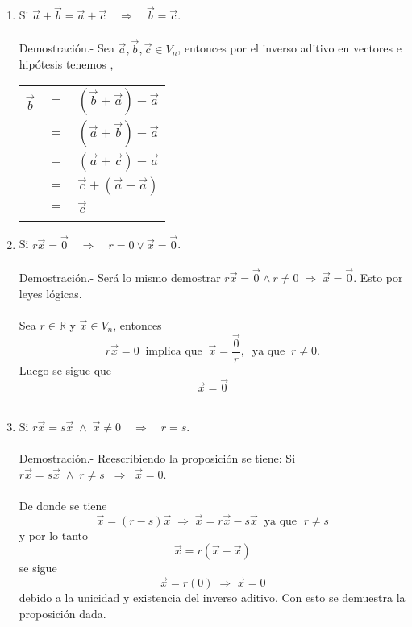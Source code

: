 \begin{enumerate}
\begin{enumerate}[\bfseries a)]
    \item Si $\vec{a}+\vec{b}=\vec{a}+\vec{c} \quad \Longrightarrow \quad \vec{b}=\vec{c}$.\\\\
	Demostración.-\; Sea $\vec{a},\vec{b},\vec{c} \in V_n$, entonces por el inverso aditivo en vectores e hipótesis tenemos ,
	\begin{center}
	    \begin{tabular}{rcl}
		$\vec{b}$&$=$&$(\vec{b}+\vec{a})-\vec{a}$\\
		&$=$&$(\vec{a}+\vec{b})-\vec{a}$\\
		&$=$&$(\vec{a}+\vec{c})-\vec{a}$\\
		&$=$&$\vec{c}+(\vec{a}-\vec{a})$\\
		&$=$&$\vec{c}$\\\\
	    \end{tabular}
	\end{center}

    \item Si $r\vec{x}=\vec{0}\quad \Longrightarrow \quad r=0 \lor \vec{x}=\vec{0}$.\\\\
	Demostración.-\; Será lo mismo demostrar $r\vec{x}=\vec{0}  \land r\neq 0\;\Longrightarrow\;\vec{x}=\vec{0}$. Esto por leyes lógicas.\\\\
	Sea $r\in \mathbb{R}$ y $\vec{x} \in V_n$, entonces $$r\vec{x}=0 \;\; \mbox{implica que}\;\;  \vec{x}=\dfrac{\vec{0}}{r}, \;\; \mbox{ya que}\;\; r\neq 0.$$ Luego se sigue que $$\vec{x}=\vec{0}$$\\

    \item Si $r\vec{x}=s\vec{x}\;\land\; \vec{x}\neq 0 \quad \Longrightarrow \quad r=s$.\\\\
	Demostración.-\; Reescribiendo la proposición se tiene: Si $r\vec{x}=s\vec{x}\; \land \; r\neq s \;\; \Longrightarrow \; \; \vec{x}=0$.\\\\ 
	De donde se tiene $$\vec{x}=(r-s)\vec{x} \; \Longrightarrow \; \vec{x}=r\vec{x}-s\vec{x} \; \; \mbox{ya que }\; r\neq s$$ 
	y por lo tanto $$\vec{x}=r(\vec{x}-\vec{x})$$
	se sigue $$\vec{x}=r(0) \; \Longrightarrow \; \vec{x}=0$$
	debido a la unicidad y existencia del inverso aditivo. Con esto se demuestra la proposición dada.\\\\


\end{enumerate}
\end{enumerate}

